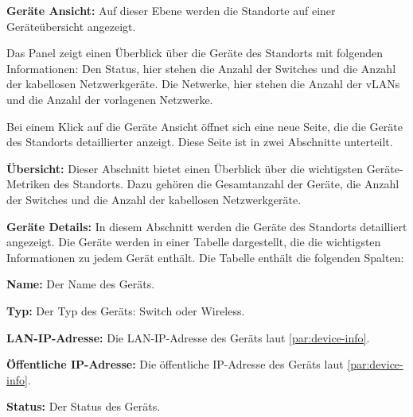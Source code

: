 \begin{compactitem}
\begin{compactitem}
\begin{compactitem}
\begin{compactitem}
\begin{compactitem}
                \end{compactitem}

            \end{compactitem}

            \item \textbf{Geräte Ansicht:} Auf dieser Ebene werden die Standorte auf einer Geräteübersicht angezeigt.
            \item \label{par:geraete-ansicht}
            Das Panel zeigt einen Überblick über die Geräte des Standorts mit folgenden Informationen:
            Den Status, hier stehen die Anzahl der Switches und die Anzahl der kabellosen Netzwerkgeräte.
            Die Netwerke, hier stehen die Anzahl der vLANs und die Anzahl der vorlagenen Netzwerke.

            Bei einem Klick auf die Geräte Ansicht öffnet sich eine neue Seite, die die Geräte des Standorts detaillierter anzeigt.
            Diese Seite ist in zwei Abschnitte unterteilt.

            \begin{compactitem}
                \item \textbf{Übersicht:} Dieser Abschnitt bietet einen Überblick über die wichtigsten Geräte-Metriken des Standorts. 
                Dazu gehören die Gesamtanzahl der Geräte, die Anzahl der Switches und die Anzahl der kabellosen Netzwerkgeräte.

                \item \textbf{Geräte Details:} In diesem Abschnitt werden die Geräte des Standorts detailliert angezeigt.
                Die Geräte werden in einer Tabelle dargestellt, die die wichtigsten Informationen zu jedem Gerät enthält.
                Die Tabelle enthält die folgenden Spalten:
                \begin{compactitem}
                    \item \textbf{Name:} Der Name des Geräts.
                    \item \textbf{Typ:} Der Typ des Geräts: Switch oder Wireless.
                    \item \textbf{LAN-IP-Adresse:} Die LAN-IP-Adresse des Geräts laut \ref{par:device-info}.
                    \item \textbf{Öffentliche IP-Adresse:} Die öffentliche IP-Adresse des Geräts laut \ref{par:device-info}.
                    \item \textbf{Status:} Der Status des Geräts.
                \end{compactitem}


\end{compactitem}
\end{compactitem}
\end{compactitem}
\end{compactitem}
